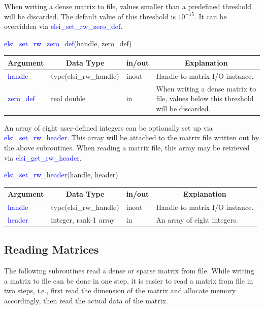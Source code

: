 \documentclass{report}
\newcommand{\tcb}[1]{\textcolor{blue}{#1}}
\begin{document}
When writing a dense matrix to file, values smaller than a predefined threshold will be discarded. The default value of this threshold is $10^{-15}$. It can be overridden via \tcb{elsi\_set\_rw\_zero\_def}.
\begin{labeling}{\hspace{6cm}}
\item [\hspace{0.3cm} \tcb{elsi\_set\_rw\_zero\_def}(handle, zero\_def)]
\end{labeling}

\begin{tabular}[]{|p{20mm}|p{45mm}|p{15mm}|p{85mm}|}
\hline
\multicolumn{1}{|c|}{\textbf{Argument}} & \multicolumn{1}{c|}{\textbf{Data Type}} & \multicolumn{1}{c|}{\textbf{in/out}} & \multicolumn{1}{c|}{\textbf{Explanation}}\\
\hline
\tcb{handle}    & type(elsi\_rw\_handle) & inout & Handle to matrix I/O instance.\\
\hline
\tcb{zero\_def} & real double            & in    & When writing a dense matrix to file, values below this threshold will be discarded.\\
\hline
\end{tabular}

An array of eight user-defined integers can be optionally set up via \tcb{elsi\_set\_rw\_header}. This array will be attached to the matrix file written out by the above subroutines. When reading a matrix file, this array may be retrieved via \tcb{elsi\_get\_rw\_header}.
\begin{labeling}{\hspace{6cm}}
\item [\hspace{0.3cm} \tcb{elsi\_set\_rw\_header}(handle, header)]
\end{labeling}

\begin{tabular}[]{|p{20mm}|p{45mm}|p{15mm}|p{85mm}|}
\hline
\multicolumn{1}{|c|}{\textbf{Argument}} & \multicolumn{1}{c|}{\textbf{Data Type}} & \multicolumn{1}{c|}{\textbf{in/out}} & \multicolumn{1}{c|}{\textbf{Explanation}}\\
\hline
\tcb{handle} & type(elsi\_rw\_handle) & inout & Handle to matrix I/O instance.\\
\hline
\tcb{header} & integer, rank-1 array  & in    & An array of eight integers.\\
\hline
\end{tabular}

\subsection{Reading Matrices}
\label{subsec:rw_read}
The following subroutines read a dense or sparse matrix from file. While writing a matrix to file can be done in one step, it is easier to read a matrix from file in two steps, i.e., first read the dimension of the matrix and allocate memory accordingly, then read the actual data of the matrix.
\end{document}
